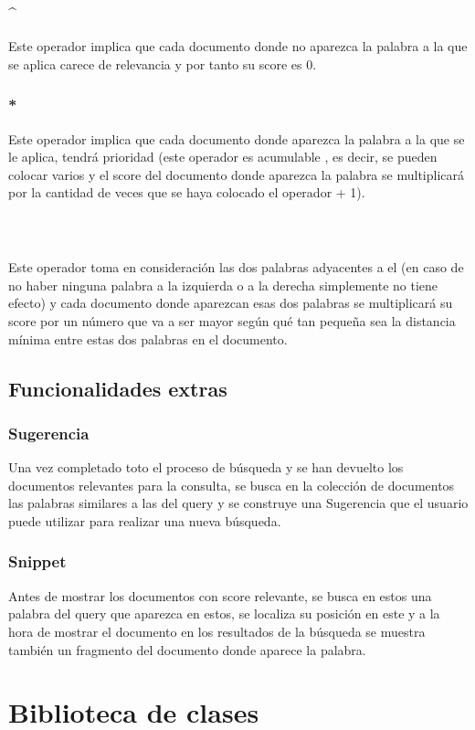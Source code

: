 \documentclass{report}
\begin{document}
 \subsection{\^{}}
Este operador implica que cada documento donde no aparezca la palabra a la que se aplica carece de relevancia y por tanto su score es 0.
\subsection{*}
Este operador implica que cada documento donde aparezca la palabra a la que se le aplica, tendrá prioridad (este operador es acumulable
, es decir, se pueden colocar varios y el score del documento donde aparezca la palabra se multiplicará por la cantidad de veces que se haya 
colocado el operador + 1).
\subsection{~}
Este operador toma en consideración las dos palabras adyacentes a el (en caso de no haber ninguna palabra a la izquierda o a la derecha simplemente 
no tiene efecto) y cada documento donde aparezcan esas dos palabras se multiplicará su score por un número que va a ser mayor según qué tan pequeña 
sea la distancia mínima  entre estas dos palabras en el documento.

\section{Funcionalidades extras}
\subsection{Sugerencia}
Una vez completado toto el proceso de búsqueda y se han devuelto los documentos relevantes para la consulta, 
se busca en la colección de documentos las palabras similares a las del query y se construye una Sugerencia que 
el usuario puede utilizar para realizar una nueva búsqueda.
\subsection{Snippet}
Antes de mostrar los documentos con score relevante, se busca en estos una palabra del query que aparezca en estos, se localiza
su posición en este y a la hora de mostrar el documento en los resultados de la búsqueda se muestra también un fragmento del documento
donde aparece la palabra.



\chapter{Biblioteca de clases}
\end{document}
